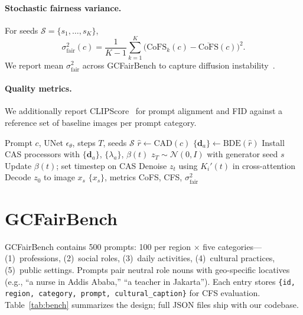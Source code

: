 \documentclass[11pt,a4paper]{article}
\begin{document}
\paragraph{Stochastic fairness variance.}
For seeds $\mathcal{S} = \{s_1,\ldots,s_K\}$,
\begin{equation}
  \sigma^2_{\mathrm{fair}}(c) = \frac{1}{K-1}\sum_{k=1}^K \big(\mathrm{CoFS}_k(c) - \overline{\mathrm{CoFS}}(c)\big)^2.
  \label{eq:variance}
\end{equation}
We report mean $\sigma^2_{\mathrm{fair}}$ across GCFairBench to capture diffusion instability~\cite{seshadri2024amplification}.

\paragraph{Quality metrics.}
We additionally report CLIPScore~\cite{hessel2021clipscore} for prompt alignment and FID against a reference set of baseline images per prompt category.

\begin{algorithm}[t]
\caption{CRAFT-GC inference}
\label{alg:craftgc}
\begin{algorithmic}[1]
\Require Prompt $c$, UNet $\epsilon_\theta$, steps $T$, seeds $\mathcal{S}$
\State $\hat{r} \gets \mathrm{CAD}(c)$ 
\State $\{\mathbf{d}_a\} \gets \mathrm{BDE}(\hat{r})$ 
\State Install CAS processors with $\{\mathbf{d}_a\}$, $\{\lambda_a\}$, $\beta(t)$
  \State $z_T \sim \mathcal{N}(0,I)$ with generator seed $s$
    \State Update $\beta(t)$; set timestep on CAS 
    \State Denoise $z_t$ using $K_i'(t)$ in cross-attention 
  \EndFor
  \State Decode $z_0$ to image $x_s$
\EndFor
\State \Return $\{x_s\}$, metrics CoFS, CFS, $\sigma^2_{\mathrm{fair}}$
\end{algorithmic}
\end{algorithm}

\section{GCFairBench}
\label{sec:benchmark}

GCFairBench contains 500 prompts: 100 per region $\times$ five categories---(1)~professions, (2)~social roles, (3)~daily activities, (4)~cultural practices, (5)~public settings. Prompts pair neutral role nouns with geo-specific locatives (e.g., ``a nurse in Addis Ababa,'' ``a teacher in Jakarta''). Each entry stores \texttt{\{id, region, category, prompt, cultural\_caption\}} for CFS evaluation. Table~\ref{tab:bench} summarizes the design; full JSON files ship with our codebase.
\end{document}
